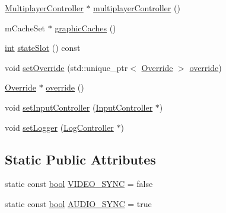 \begin{DoxyCompactItemize}
\item 
\mbox{\hyperlink{class_q_g_b_a_1_1_multiplayer_controller}{Multiplayer\+Controller}} $\ast$ \mbox{\hyperlink{class_q_g_b_a_1_1_core_controller_a991487e88ca6ac023475ed74d2fdc820}{multiplayer\+Controller}} ()
\item 
m\+Cache\+Set $\ast$ \mbox{\hyperlink{class_q_g_b_a_1_1_core_controller_aaea9e7a9dc8177cd3f9e778ad81e45af}{graphic\+Caches}} ()
\item 
\mbox{\hyperlink{ioapi_8h_a787fa3cf048117ba7123753c1e74fcd6}{int}} \mbox{\hyperlink{class_q_g_b_a_1_1_core_controller_acaf4e2229f8ea442f46adca7d313f2b5}{state\+Slot}} () const
\item 
void \mbox{\hyperlink{class_q_g_b_a_1_1_core_controller_a90b751511ea4c1c1f76f68b7aa278a9c}{set\+Override}} (std\+::unique\+\_\+ptr$<$ \mbox{\hyperlink{class_q_g_b_a_1_1_override}{Override}} $>$ \mbox{\hyperlink{class_q_g_b_a_1_1_core_controller_acb949cb410a97707fceab00d39281cc4}{override}})
\item 
\mbox{\hyperlink{class_q_g_b_a_1_1_override}{Override}} $\ast$ \mbox{\hyperlink{class_q_g_b_a_1_1_core_controller_acb949cb410a97707fceab00d39281cc4}{override}} ()
\item 
void \mbox{\hyperlink{class_q_g_b_a_1_1_core_controller_a6f475f57f41e5fe91d4cc93358bd6bfb}{set\+Input\+Controller}} (\mbox{\hyperlink{class_q_g_b_a_1_1_input_controller}{Input\+Controller}} $\ast$)
\item 
void \mbox{\hyperlink{class_q_g_b_a_1_1_core_controller_aabf966793a76ac2c77cb4f89def2c08f}{set\+Logger}} (\mbox{\hyperlink{class_q_g_b_a_1_1_log_controller}{Log\+Controller}} $\ast$)
\end{DoxyCompactItemize}
\subsection*{Static Public Attributes}
\begin{DoxyCompactItemize}
\item 
static const \mbox{\hyperlink{libretro_8h_a4a26dcae73fb7e1528214a068aca317e}{bool}} \mbox{\hyperlink{class_q_g_b_a_1_1_core_controller_a6047bb40fa1ced404b0f7ebada271fc0}{V\+I\+D\+E\+O\+\_\+\+S\+Y\+NC}} = false
\item 
static const \mbox{\hyperlink{libretro_8h_a4a26dcae73fb7e1528214a068aca317e}{bool}} \mbox{\hyperlink{class_q_g_b_a_1_1_core_controller_a240f2fe20251cd1eb1b51784b2f3626c}{A\+U\+D\+I\+O\+\_\+\+S\+Y\+NC}} = true
\end{DoxyCompactItemize}
